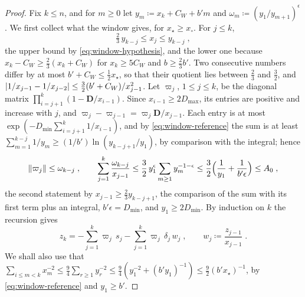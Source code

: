\documentclass[11pt]{preprint}
\DeclarePairedDelimiter{\abs}{\lvert}{\rvert}
\DeclarePairedDelimiter{\norm}{\lVert}{\rVert}
\numberwithin{equation}{section}
\theoremstyle{definition}
\theoremstyle{remark}
\theoremstyle{plain}
\begin{document}
\begin{proof}
Fix $k \leq n$, and for $m \geq 0$ let $y_m \coloneqq x_k + C_W + b'm$ and $\omega_m \coloneqq (y_1/y_{m+1})^\epsilon$. We first collect what the window gives, for $x_\star \geq x_\circ$. For $j \leq k$,
\begin{equation}\label{eq:window-reference}
    \tfrac23\,y_{k-j} \leq x_j \leq y_{k-j}\;,
\end{equation}
the upper bound by \eqref{eq:window-hypothesis}, and the lower one because $x_k - C_W \geq \frac23(x_k + C_W)$ for $x_k \geq 5C_W$ and $b \geq \frac23b'$. Two consecutive numbers differ by at most $b' + C_W \leq \frac12x_\star$, so that their quotient lies between $\frac23$ and $\frac32$, and $\abs{1/x_{j-1} - 1/x_{j-2}} \leq \frac32(b' + C_W)/x_{j-1}^2$. Let $\varpi_j$, $1 \leq j \leq k$, be the diagonal matrix $\prod_{i=j+1}^{k}(1 - \mathbf D/x_{i-1})$. Since $x_{i-1} \geq 2D_{\max}$, its entries are positive and increase with $j$, and $\varpi_j - \varpi_{j-1} = \varpi_j\mathbf D/x_{j-1}$. Each entry is at most $\exp(-D_{\min}\sum_{i=j+1}^{k}1/x_{i-1})$, and by \eqref{eq:window-reference} the sum is at least $\sum_{m=1}^{k-j}1/y_m \geq (1/b')\ln(y_{k-j+1}/y_1)$, by comparison with the integral; hence
\begin{equation}\label{eq:damped-weights}
    \norm{\varpi_j} \leq \omega_{k-j}\;,
    \qquad
    \sum_{j=1}^{k}\frac{\omega_{k-j}}{x_{j-1}} \leq \frac32\,y_1^\epsilon\sum_{m \geq 1}y_m^{-1-\epsilon} \leq \frac32\Bigl(\frac{1}{y_1} + \frac{1}{b'\epsilon}\Bigr) \leq A_0\;,
\end{equation}
the second statement by $x_{j-1} \geq \frac23y_{k-j+1}$, the comparison of the sum with its first term plus an integral, $b'\epsilon = D_{\min}$, and $y_1 \geq 2D_{\min}$. By induction on $k$ the recursion gives
\begin{equation}\label{eq:damped-sums-solution}
    z_k = -\sum_{j=1}^{k}\varpi_j\,s_j - \sum_{j=1}^{k}\varpi_j\,\delta_j\,w_j\;,
    \qquad
    w_j \coloneqq \frac{z_{j-1}}{x_{j-1}}\;.
\end{equation}
We shall also use that $\sum_{i \leq m < k}x_m^{-2} \leq \frac94\sum_{r \geq 1}y_r^{-2} \leq \frac94(y_1^{-2} + (b'y_1)^{-1}) \leq \frac92(b'x_\star)^{-1}$, by \eqref{eq:window-reference} and $y_1 \geq b'$.


\end{proof}
\end{document}
